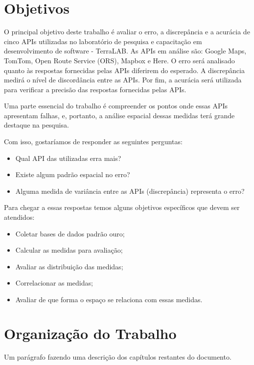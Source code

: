 \section{Objetivos}
O principal objetivo deste trabalho é avaliar o erro, a discrepância e a acurácia de cinco APIs utilizadas no laboratório de pesquisa e capacitação em desenvolvimento de software - TerraLAB. As APIs em análise são: Google Maps, TomTom, Open Route Service (ORS), Mapbox e Here. O erro será analisado quanto às respostas fornecidas pelas APIs diferirem do esperado. A discrepância medirá o nível de discordância entre as APIs. Por fim, a acurácia será utilizada para verificar a precisão das respostas fornecidas pelas APIs.

Uma parte essencial do trabalho é compreender os pontos onde essas APIs apresentam falhas, e, portanto, a análise espacial dessas medidas terá grande destaque na pesquisa.

Com isso, gostaríamos de responder as seguintes perguntas:
\begin{itemize}
   \item Qual API das utilizadas erra mais?
   \item Existe algum padrão espacial no erro?
   \item Alguma medida de variância entre as APIs (discrepância) representa o erro? 
\end{itemize}

Para chegar a essas  respostas temos alguns objetivos específicos que devem ser atendidos:
\begin{itemize}
   \item Coletar bases de dados padrão ouro;
   \item Calcular as medidas para avaliação;
   \item Avaliar as distribuição das medidas; 
   \item Correlacionar as medidas; 
   \item Avaliar de que forma o espaço se relaciona com essas medidas.
\end{itemize}





\section{Organização do Trabalho}

Um parágrafo fazendo uma descrição dos capítulos restantes do documento. 


